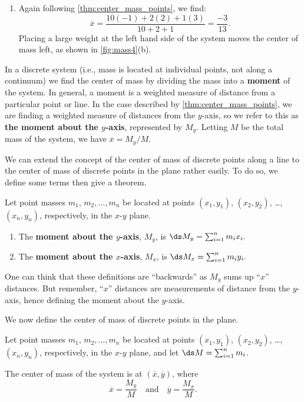 \begin{example}
\begin{enumerate}
	\item	Again following \autoref{thm:center_mass_points}, we find:
	\[\overline{x} = \frac{10(-1)+2(2)+1(3)}{10+2+1} = \frac{-3}{13}%
	.\]
	Placing a large weight at the left hand side of the system moves the center of mass left, as shown in \autoref{fig:mass4}(b).
\end{enumerate}
\end{example}

In a discrete system (i.e., mass is located at individual points, not along a continuum) we find the center of mass by dividing the mass into a \textbf{moment} of the system. In general, a moment is a weighted measure of distance from a particular point or line. In the case described by \autoref{thm:center_mass_points}, we are finding a weighted measure of distances from the $y$-axis, so we refer to this as \textbf{the moment about the $y$-axis}, represented by $M_y$.  Letting $M$ be the total mass of the system, we have  $\overline{x} = M_y/M$. 

We can extend the concept of the center of mass of discrete points along a line to the center of mass of discrete points in the plane rather easily. To do so, we define some terms then give a theorem.

\begin{definition}\label{def:moment}
Let point masses $m_1$, $m_2,\dots,m_n$ be located at points $(x_1,y_1)$, $(x_2,y_2)$, \dots, $(x_n,y_n)$, respectively, in the $x$-$y$ plane. 
\begin{enumerate}
	\item The \textbf{moment about the $y$-axis}, $M_y$, is 
	$\ds M_y = \sum_{i=1}^n m_ix_i.$
	\item The \textbf{moment about the $x$-axis}, $M_x$, is 
	$\ds M_x = \sum_{i=1}^n m_iy_i.$
	\end{enumerate}
\end{definition}

One can think that these definitions are ``backwards'' as $M_y$ sums up ``$x$'' distances. But remember, ``$x$'' distances are measurements of distance from the $y$-axis, hence defining the moment about the $y$-axis.

We now define the center of mass of discrete points in the plane.

\begin{theorem}\label{thm:center_mass_points_plane}
Let point masses $m_1$, $m_2,\dots,m_n$ be located at points $(x_1,y_1)$, $(x_2,y_2)$, \dots, $(x_n,y_n)$, respectively, in the $x$-$y$ plane, and let $\ds M = \sum_{i=1}^n m_i$.  

The center of mass of the system is at $(\overline{x},\overline{y})$, where 
\[\overline{x}= \frac{M_y}{M}\quad \text{and}\quad \overline{y} = \frac{M_x}{M}.\]
\end{theorem}


